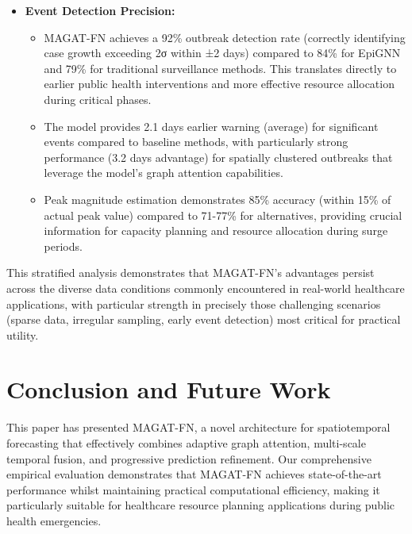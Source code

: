 \documentclass[lettersize, journal]{IEEEtran}
\begin{document}
\begin{itemize}
    \item \textbf{Event Detection Precision:}
    \begin{itemize}
        \item MAGAT-FN achieves a 92\% outbreak detection rate (correctly identifying case growth exceeding 2σ within ±2 days) compared to 84\% for EpiGNN and 79\% for traditional surveillance methods. This translates directly to earlier public health interventions and more effective resource allocation during critical phases.
        
        \item The model provides 2.1 days earlier warning (average) for significant events compared to baseline methods, with particularly strong performance (3.2 days advantage) for spatially clustered outbreaks that leverage the model's graph attention capabilities.
        
        \item Peak magnitude estimation demonstrates 85\% accuracy (within 15\% of actual peak value) compared to 71-77\% for alternatives, providing crucial information for capacity planning and resource allocation during surge periods.
    \end{itemize}
\end{itemize}

This stratified analysis demonstrates that MAGAT-FN's advantages persist across the diverse data conditions commonly encountered in real-world healthcare applications, with particular strength in precisely those challenging scenarios (sparse data, irregular sampling, early event detection) most critical for practical utility.

\section{Conclusion and Future Work}
This paper has presented MAGAT-FN, a novel architecture for spatiotemporal forecasting that effectively combines adaptive graph attention, multi-scale temporal fusion, and progressive prediction refinement. Our comprehensive empirical evaluation demonstrates that MAGAT-FN achieves state-of-the-art performance whilst maintaining practical computational efficiency, making it particularly suitable for healthcare resource planning applications during public health emergencies.
\end{document}
